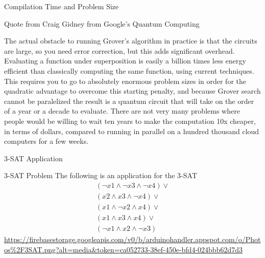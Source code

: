 \documentclass{beamer}
\begin{document}
\begin{frame}{Compilation Time and Problem Size}
	\begin{block}{Quote from Craig Gidney from Google's Quantum Computing}
		\begin{displayquote}
			The actual obstacle to running Grover's algorithm in practice is that the circuits are large, so you need error correction, but this adds significant overhead. Evaluating a function under superposition is easily a billion times less energy efficient than classically computing the same function, using current techniques. This requires you to go to absolutely enormous problem sizes in order for the quadratic advantage to overcome this starting penalty, and because Grover search cannot be paralelized the result is a quantum circuit that will take on the order of a year or a decade to evaluate. There are not very many problems where people would be willing to wait ten years to make the computation 10x cheaper, in terms of dollars, compared to running in parallel on a hundred thousand cloud computers for a few weeks.
		\end{displayquote}
	\end{block}
\end{frame}

\begin{frame}{3-SAT Application}
	\begin{block}{3-SAT Problem}
		The following is an application for the 3-SAT
		\[
			\begin{matrix}
				(\neg x1 \wedge \neg x3 \wedge \neg x4) \vee \\
				(x2 \wedge x3 \wedge \neg x4) \vee           \\
				(x1 \wedge \neg x2 \wedge x4) \vee           \\
				(x1 \wedge x3 \wedge x4) \vee                \\
				(\neg x1 \wedge x2 \wedge \neg x3)
			\end{matrix}
		\]
		\url{https://firebasestorage.googleapis.com/v0/b/arduinohandler.appspot.com/o/Photos\%2F3SAT.png?alt=media\&token=ca052733-38ef-450e-bfd4-024bbb62d7d3}
	\end{block}
\end{frame}
\end{document}
